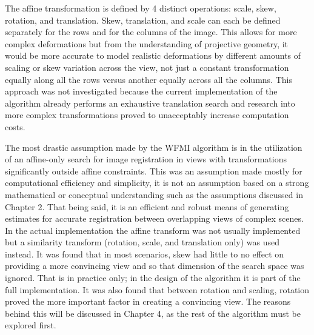 %
%
%
%
%
%
%
%
%

%
%
%



The affine transformation is defined by 4 distinct operations: scale, skew, rotation, and translation. Skew, translation, and scale can each be defined separately for the rows and for the columns of the image. This allows for more complex deformations but from the understanding of projective geometry, it would be more accurate to model realistic deformations by different amounts of scaling or skew variation across the view, not just a constant transformation equally along all the rows versus another equally across all the columns. This approach was not investigated because the current implementation of the algorithm already performs an exhaustive translation search and research into more complex transformations proved to unacceptably increase computation costs.

The most drastic assumption made by the WFMI algorithm is in the utilization of an affine-only search for image registration in views with transformations significantly outside affine constraints. This was an assumption made mostly for computational efficiency and simplicity, it is not an assumption based on a strong mathematical or conceptual understanding such as the assumptions discussed in Chapter 2. That being said, it is an efficient and robust means of generating estimates for accurate registration between overlapping views of complex scenes. In the actual implementation the affine transform was not usually implemented but a similarity transform (rotation, scale, and translation only) was used instead. It was found that in most scenarios, skew had little to no effect on providing a more convincing view and so that dimension of the search space was ignored. That is in practice only; in the design of the algorithm it is part of the full implementation. It was also found that between rotation and scaling, rotation proved the more important factor in creating a convincing view. The reasons behind this will be discussed in Chapter 4, as the rest of the algorithm must be explored first.

